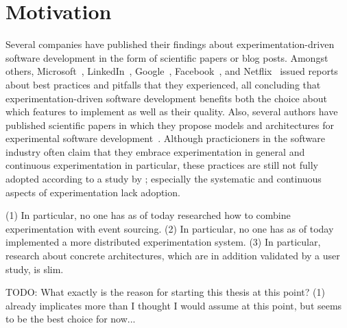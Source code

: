%
\chapter{Motivation}
\label{sec:motivation}

Several companies have published their findings about experimentation-driven software development in the form of scientific papers or blog posts.
Amongst others, Microsoft~\cite{Kohavi2013}, LinkedIn~\cite{Xu2015}, Google~\cite{Tang2010}, Facebook~\cite{Bakshy2014}, and Netflix~\cite{WEB:Netflix:2016} issued reports about best practices and pitfalls that they experienced, all concluding that experimentation-driven software development benefits both the choice about which features to implement as well as their quality.
Also, several authors have published scientific papers in which they propose models and architectures for experimental software development~\cite{Fagerholm2014,Fagerholm2017,Johanssen2017,Lindgren2015}.
Although practicioners in the software industry often claim that they embrace experimentation in general and continuous experimentation in particular, these practices are still not fully adopted according to a study by \citet{lindgren2015software}; especially the systematic and continuous aspects of experimentation lack adoption.
















(1) In particular, no one has as of today researched how to combine experimentation with event sourcing.
(2) In particular, no one has as of today implemented a more distributed experimentation system.
(3) In particular, research about concrete architectures, which are in addition validated by a user study, is slim.

 TODO: What exactly is the reason for starting this thesis at this point? (1) already implicates more than I thought I would assume at this point, but seems to be the best choice for now...


 


